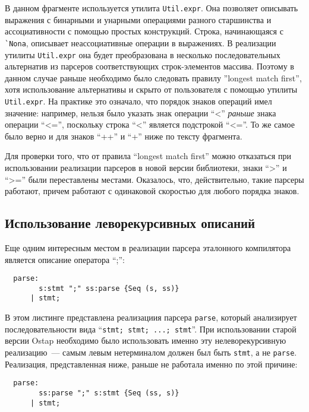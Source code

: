 \documentclass[conference]{IEEEtran}
\begin{document}
В данном фрагменте используется утилита \lstinline|Util.expr|. Она позволяет описывать выражения
с бинарными и унарными операциями разного старшинства и ассоциативности с помощью простых конструкций. Строка, начинающаяся с \lstinline|`Nona|, описывает неассоциативные
операции в выражениях. В реализации утилиты \lstinline|Util.expr| она будет преобразована в несколько последовательных альтернатив из парсеров соответствующих
строк-элементов массива. Поэтому в данном случае раньше необходимо было следовать правилу ''longest match first'', хотя использование альтернативы и скрыто от пользователя
с помощью утилиты \lstinline|Util.expr|. На практике это означало, что порядок знаков операций имел значение: например, нельзя было указать знак операции ``<'' \emph{раньше}
знака операции ``<='', поскольку строка ``<'' является подстрокой ``<=''. То же самое было верно и для знаков ``++'' и ``+'' ниже по тексту фрагмента.

Для проверки того, что от правила ``longest match first'' можно отказаться при использовании реализации парсеров в новой версии библиотеки, знаки ``>'' и ``>='' были
переставлены местами. Оказалось, что, действительно, такие парсеры работают, причем работают с одинаковой скоростью для любого порядка знаков.

\subsection{Использование леворекурсивных описаний}

Еще одним интересным местом в реализации парсера эталонного компилятора является описание оператора ``;'':

\begin{lstlisting}
  parse:
        s:stmt ";" ss:parse {Seq (s, ss)}
      | stmt;
\end{lstlisting}

В этом листинге представлена реализациия парсера \lstinline|parse|, который анализирует последовательности вида ``\lstinline|stmt; stmt; ...; stmt|''. При использовании старой
версии Ostap необходимо было использовать именно эту нелеворекурсивную реализацию~--- самым левым нетерминалом должен был быть \lstinline|stmt|, а не \lstinline|parse|. Реализация,
представленная ниже, раньше не работала именно по этой причине:

\begin{lstlisting}
  parse:
        ss:parse ";" s:stmt {Seq (ss, s)}
      | stmt;
\end{lstlisting}
\end{document}
